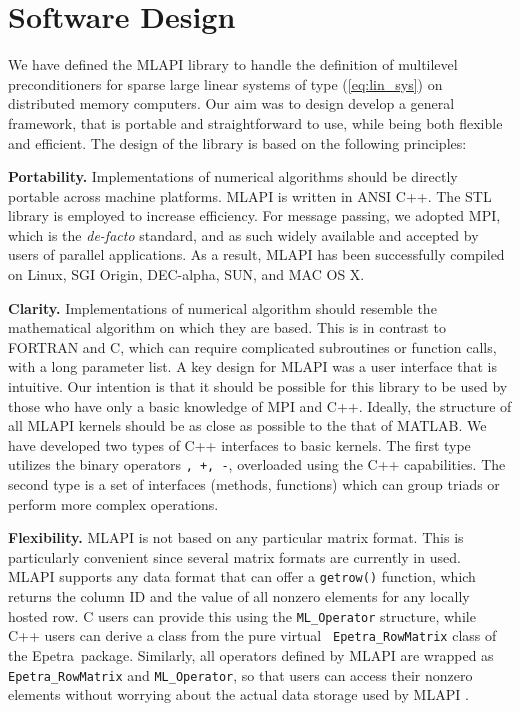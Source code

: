 \documentclass{article}[11pt]
\newcommand{\epetra}  {{\sc Epetra}}
\newcommand{\MLAPI}  {{\sc MLAPI }}
\newcommand{\mlapi}  {{\sc MLAPI }}
\begin{document}
\section{Software Design}
\label{sec:design}

We have defined the \MLAPI library to handle the definition of multilevel
preconditioners for sparse large linear systems of type (\ref{eq:lin_sys})
  on distributed memory computers.
Our aim was to design develop a general framework, that is portable and
straightforward to use, while being both flexible and efficient. 
The design of the library is based on the following principles:

\bigskip

\noindent
{\bf Portability.} Implementations of numerical algorithms should be
directly portable across machine platforms.
\MLAPI is written in ANSI C++. The STL library is
employed to increase efficiency. For message
passing, we adopted MPI, which is the {\em de-facto} standard, and as such
widely available and accepted by users of parallel applications. As a result,
  \mlapi has been successfully compiled on Linux, SGI Origin, DEC-alpha, SUN,
  and MAC OS X.

\bigskip

\noindent
{\bf Clarity.} Implementations of numerical algorithm should resemble
the mathematical algorithm on which they are based. This is in contrast to
FORTRAN and C, which can require complicated subroutines or function calls,
  with a long parameter list.
A key design for \MLAPI was a user interface that is
intuitive. Our intention is that it should be possible for this
library to be used by those who have only a basic knowledge of MPI and C++.
Ideally, the structure of all \MLAPI kernels should be as close as possible to
the that of MATLAB. We have developed two types of C++ interfaces to basic
kernels. The first type utilizes the binary operators {\tt *, +, -},
  overloaded using the C++ capabilities. The second type is a set of
  interfaces (methods, functions) which can group triads or perform more
  complex operations.

\bigskip

\noindent
{\bf Flexibility.} \MLAPI is not based on any particular matrix format. This
is particularly convenient since several matrix formats are currently in used.
\MLAPI supports any data format that can offer a {\tt getrow()} function,
  which returns the column ID and the value of all nonzero elements for any
  locally hosted row. C users can provide this using the {\tt ML\_Operator}
  structure, while C++ users can derive a class from the pure virtual {\tt
    Epetra\_RowMatrix} class of the \epetra\ package.  Similarly, all operators defined by \MLAPI are
    wrapped as {\tt Epetra\_RowMatrix} and {\tt ML\_Operator}, so that users
    can access their nonzero elements without worrying about the actual data
    storage used by \MLAPI.
\bigskip
\end{document}

